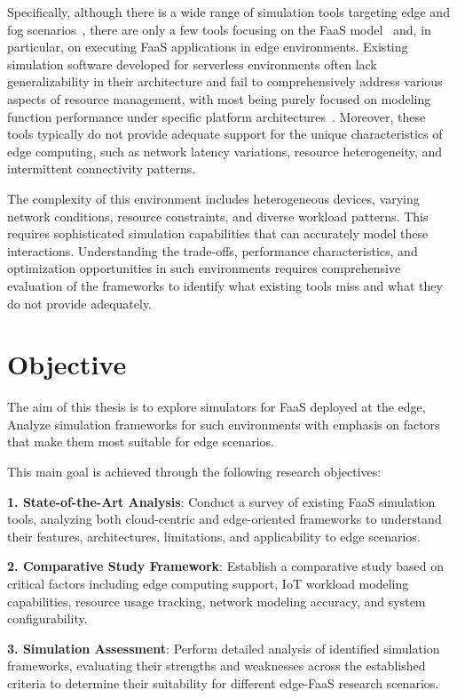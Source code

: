 Specifically, although there is a wide range of simulation tools targeting edge and fog scenarios~\cite{svorobej2019simulating}, there are only a few tools focusing on the FaaS model~\cite{mahmoudi2021simfaas} and, in particular, on executing FaaS applications in edge environments. Existing simulation software developed for serverless environments often lack generalizability in their architecture and fail to comprehensively address various aspects of resource management, with most being purely focused on modeling function performance under specific platform architectures~\cite{mampage2021cloudsimsc}. Moreover, these tools typically do not provide adequate support for the unique characteristics of edge computing, such as network latency variations, resource heterogeneity, and intermittent connectivity patterns.

The complexity of this environment includes heterogeneous devices, varying network conditions, resource constraints, and diverse workload patterns. This requires sophisticated simulation capabilities that can accurately model these interactions. Understanding the trade-offs, performance characteristics, and optimization opportunities in such environments requires comprehensive evaluation of the frameworks to identify what existing tools miss and what they do not provide adequately.

\section{Objective}

The aim of this thesis is to explore simulators for FaaS deployed at the edge, Analyze simulation frameworks for such environments with emphasis on factors that make them most suitable for edge scenarios.

This main goal is achieved through the following research objectives:

\textbf{1. State-of-the-Art Analysis}: Conduct a survey of existing FaaS simulation tools, analyzing both cloud-centric and edge-oriented frameworks to understand their features, architectures, limitations, and applicability to edge scenarios.

\textbf{2. Comparative Study Framework}: Establish a comparative study based on critical factors including edge computing support, IoT workload modeling capabilities, resource usage tracking, network modeling accuracy, and system configurability.

\textbf{3. Simulation Assessment}: Perform detailed analysis of identified simulation frameworks, evaluating their strengths and weaknesses across the established criteria to determine their suitability for different edge-FaaS research scenarios.

